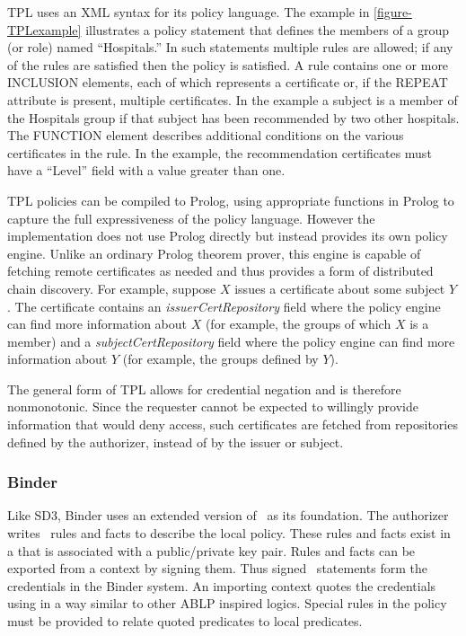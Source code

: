 TPL uses an XML syntax for its policy language. The example in
\autoref{figure-TPLexample} \cite{Herzberg:ACMPKI} illustrates a policy
statement that defines the members of a group (or role) named
``Hospitals.'' In such statements multiple rules are allowed; if any of the
rules are satisfied then the policy is satisfied. A rule contains one or
more INCLUSION elements, each of which represents a certificate or, if the
REPEAT attribute is present, multiple certificates. In the example a
subject is a member of the Hospitals group if that subject has been
recommended by two other hospitals. The FUNCTION element describes
additional conditions on the various certificates in the rule. In the
example, the recommendation certificates must have a ``Level'' field with a
value greater than one.

\TPLexamplefig

TPL policies can be compiled to Prolog, using appropriate functions in
Prolog to capture the full expressiveness of the policy language. However
the implementation does not use Prolog directly but instead provides its
own policy engine. Unlike an ordinary Prolog theorem prover, this engine is
capable of fetching remote certificates as needed and thus provides a form
of distributed chain discovery. For example, suppose $X$ issues a
certificate about some subject $Y$. The certificate contains an
\textit{issuerCertRepository} field where the policy engine can find
more information about $X$ (for example, the groups of which $X$ is a
member) and a \textit{subjectCertRepository} field where the policy
engine can find more information about $Y$ (for example, the groups
defined by $Y$).

The general form of TPL allows for credential negation and is
therefore nonmonotonic. Since the requester cannot be expected to
willingly provide information that would deny access, such
certificates are fetched from repositories defined by the authorizer,
instead of by the issuer or subject.

\subsubsection{Binder}

Like SD3, Binder \cite{DeTreville:BLBSL,DeTreville:MCP} uses an extended
version of \datalog\ as its foundation. The authorizer writes \datalog\
rules and facts to describe the local policy. These rules and facts exist
in a \newterm{context} that is associated with a public/private key pair.
Rules and facts can be exported from a context by signing them. Thus signed
\datalog\ statements form the credentials in the Binder system. An
importing context quotes the credentials using \says in a way similar to
other ABLP inspired logics. Special rules in the policy must be provided to
relate quoted predicates to local predicates.

